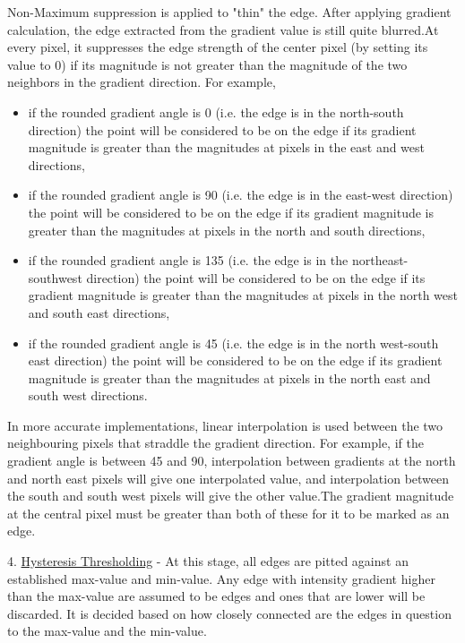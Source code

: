 \documentclass[BTech]{srmuthesis}
\begin{document}
Non-Maximum suppression is applied to "thin" the edge. After applying gradient calculation, the edge extracted from the gradient value is still quite blurred.At every pixel, it suppresses the edge strength of the center pixel (by setting its value to 0) if its magnitude is not greater than the magnitude of the two neighbors in the gradient direction. For example,
\begin{itemize}
\item if the rounded gradient angle is 0{\degree} (i.e. the edge is in the north-south direction) the point will be considered to be on the edge if its gradient magnitude is greater than the magnitudes at pixels in the east and west directions,
\end{itemize}
\begin{itemize}
\item if the rounded gradient angle is 90{\degree} (i.e. the edge is in the east-west direction) the point will be considered to be on the edge if its gradient magnitude is greater than the magnitudes at pixels in the north and south directions,
\end{itemize}
\begin{itemize}
\item if the rounded gradient angle is 135{\degree} (i.e. the edge is in the northeast-southwest direction) the point will be considered to be on the edge if its gradient magnitude is greater than the magnitudes at pixels in the north west and south east directions,
\end{itemize}
\begin{itemize}
\item if the rounded gradient angle is 45{\degree} (i.e. the edge is in the north west-south east direction) the point will be considered to be on the edge if its gradient magnitude is greater than the magnitudes at pixels in the north east and south west directions.
\end{itemize}
In more accurate implementations, linear interpolation is used between the two neighbouring pixels that straddle the gradient direction. For example, if the gradient angle is between 45 and 90, interpolation between gradients at the north and north east pixels will give one interpolated value, and interpolation between the south and south west pixels will give the other value.The gradient magnitude at the central pixel must be greater than both of these for it to be marked as an edge.

4. \underline{Hysteresis Thresholding} - At this stage, all edges are pitted against an established max-value and
min-value. Any edge with intensity gradient higher than the max-value are assumed to be edges and ones that are lower will be discarded. It is decided based on how closely connected are the edges in question to the max-value and
the min-value.
\end{document}
